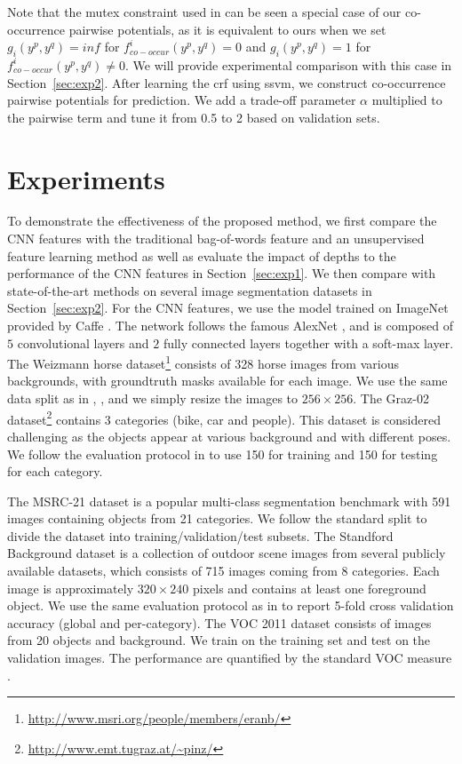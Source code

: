 \documentclass[10pt,3p]{elsarticle}
\newcommand{\ssvm}{{\sc ssvm}\xspace}
\newcommand{\crf}{{\sc crf}\xspace}
\begin{document}
Note that the mutex constraint used in \cite{Roy14} can be seen a special case of our co-occurrence pairwise potentials, as it is equivalent to ours when we set $g_i(y^p, y^q)=inf$  for  $f^i_{co-occur}(y^p, y^q)=0$ and $g_i(y^p, y^q)=1$  for  $f^i_{co-occur}(y^p, y^q) \neq 0$.
We will provide experimental comparison with this case in Section~\ref{sec:exp2}.
After learning the \crf using \ssvm, we construct co-occurrence pairwise potentials for prediction.
We add a trade-off parameter $\alpha$ multiplied to the pairwise term and tune it from 0.5 to 2 based on validation sets.






\section{Experiments}
To demonstrate the effectiveness of the proposed method, we first compare the CNN features with the traditional bag-of-words feature and an unsupervised feature learning method \cite{Coates11} as well as evaluate the impact of depths to the performance of the CNN features in Section~\ref{sec:exp1}.
We then compare with state-of-the-art methods on several image segmentation datasets in Section~\ref{sec:exp2}.
For the CNN features, we use the model trained on ImageNet provided by Caffe \cite{Jia13caffe}.
The network follows the famous AlexNet \cite{deepCNN12}, and is composed of $5$ convolutional layers and $2$ fully connected layers together with a soft-max layer.
The Weizmann horse dataset\footnote{\url{ http://www.msri.org/people/members/eranb/} }  consists of 328 horse images from various backgrounds, with groundtruth masks available for each image. We use the same data split as in \cite{Bertelli11}, \cite{Kuettel12}, and we simply resize the images to $256 \times 256$.
The Graz-02
dataset\footnote{\url{http://www.emt.tugraz.at/~pinz/} } contains 3 categories (bike, car and people). 
This dataset is considered challenging as the objects appear at various background and with different poses.  
We follow the evaluation protocol in \cite{Marszalek07} to use 150 for training and 150 for testing for each category.

The MSRC-21 dataset \cite{Shotton08} is a popular multi-class segmentation benchmark with 591 images containing objects from 21 categories. We follow the standard split to divide the dataset into training/validation/test subsets. 
The Standford Background dataset \cite{Gould09} is a collection of outdoor scene images from several publicly available datasets,  which consists of 715 images coming from 8 categories. Each image is approximately $320 \times 240$ pixels and contains at least one foreground object. We use the same evaluation protocol as in \cite{Gould09} to report 5-fold cross validation accuracy (global and per-category).
The VOC 2011 dataset consists of images from 20 objects and background.
We train on the training set and test on the validation images. 
The performance are quantified by the standard VOC measure \cite{PascalVOC}.
\end{document}
